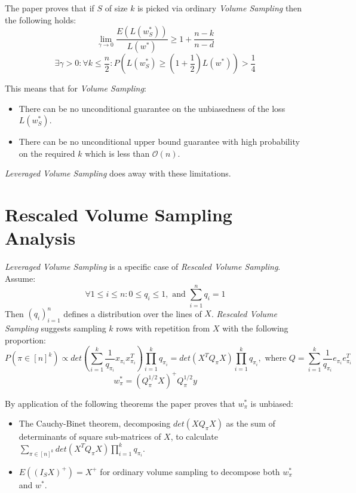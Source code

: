 \documentclass{article}
\begin{document}
        The paper proves that if $S$ of size $k$ is picked via ordinary \textit{Volume Sampling} then the following holds:
        \begin{equation}
            \lim\limits_{\gamma \to 0} \frac{E(L(w_{S}^\ast))}{L(w^\ast)} \geq 1+\frac{n-k}{n-d}
        \end{equation}
        \begin{equation}
            \exists \gamma > 0: \forall k \leq \frac{n}{2}: P(L(w_{S}^\ast) \geq (1+\frac{1}{2})L(w^\ast)) > \frac{1}{4}
        \end{equation}

        This means that for \textit{Volume Sampling}:
        \begin{itemize}
            \item There can be no unconditional guarantee on the unbiasedness of the loss $L(w_{S}^\ast)$.
            \item There can be no unconditional upper bound guarantee with high probability on the required $k$ which is less than $\mathcal{O}(n)$.
        \end{itemize}

        \textit{Leveraged Volume Sampling} does away with these limitations.

    \section{Rescaled Volume Sampling Analysis}
        \textit{Leveraged Volume Sampling} is a specific case of \textit{Rescaled Volume Sampling}.
        Assume:
        \begin{equation*}
            \forall 1 \leq i \leq n: 0 \le q_{i} \leq 1, \text{ and } \sum_{i=1}^{n}q_{i} = 1
        \end{equation*}
        Then $(q_{i})_{i=1}^n$ defines a distribution over the lines of $X$.
        \textit{Rescaled Volume Sampling} suggests sampling $k$ rows with repetition from $X$ with the following proportion:
        \begin{equation}
            P(\pi \in [n]^k) \propto det(\sum_{i=1}^{k}\frac{1}{q_{\pi_{i}}}x_{\pi_{i}}x_{\pi_{i}}^T)\prod_{i=1}^{k}q_{\pi_{i}} = det(X^{T}Q_{\pi}X)\prod_{i=1}^{k}q_{\pi_{i}},
            \text{ where } Q=\sum_{i=1}^{k}\frac{1}{q_{\pi_{i}}}e_{\pi_{i}}e_{\pi_{i}}^T
        \end{equation}
        \begin{equation}
            w_{\pi}^\ast=(Q_{\pi}^{1/2}X)^{+}Q_{\pi}^{1/2}y
        \end{equation}

        By application of the following theorems the paper proves that $w_{\pi}^\ast$ is unbiased:
        \begin{itemize}
            \item The Cauchy-Binet theorem, decomposing $det(XQ_{\pi}X)$ as the sum of determinants of square sub-matrices of $X$, to calculate $\sum_{\pi \in [n]^k}det(X^{T}Q_{\pi}X)\prod_{i=1}^{k}q_{\pi_{i}}$.
            \item $E((I_{S}X)^+) = X^+$ for ordinary volume sampling to decompose both $w_{\pi}^\ast$ and $w^\ast$.
        \end{itemize}
\end{document}
